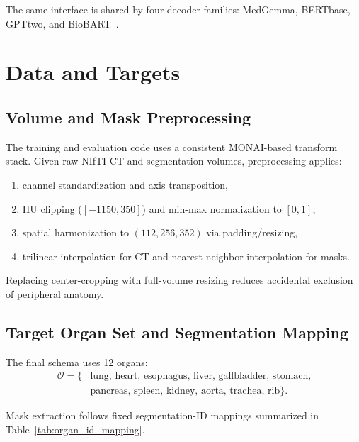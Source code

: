 The same interface is shared by four decoder families: MedGemma, \ac{BERTbase}, \ac{GPTtwo}, and BioBART~\cite{yang2024medgemma,devlin2019bert,radford2019language,yuan2022biobart}.

\section{Data and Targets}\label{sec:method_data_targets}
\subsection{Volume and Mask Preprocessing}
The training and evaluation code uses a consistent \ac{MONAI}-based transform stack. Given raw \ac{NIfTI} CT and segmentation volumes, preprocessing applies:
\begin{enumerate}
    \item channel standardization and axis transposition,
    \item HU clipping ($[-1150, 350]$) and min-max normalization to $[0,1]$,
    \item spatial harmonization to $(112,256,352)$ via padding/resizing,
    \item trilinear interpolation for CT and nearest-neighbor interpolation for masks.
\end{enumerate}

Replacing center-cropping with full-volume resizing reduces accidental exclusion of peripheral anatomy.

\subsection{Target Organ Set and Segmentation Mapping}
The final schema uses 12 organs:
\begin{equation}
\begin{aligned}
\mathcal{O} = \{&\text{lung, heart, esophagus, liver, gallbladder, stomach,} \\
               &\text{pancreas, spleen, kidney, aorta, trachea, rib}\}.
\end{aligned}
\end{equation}

Mask extraction follows fixed segmentation-ID mappings summarized in Table~\ref{tab:organ_id_mapping}.

